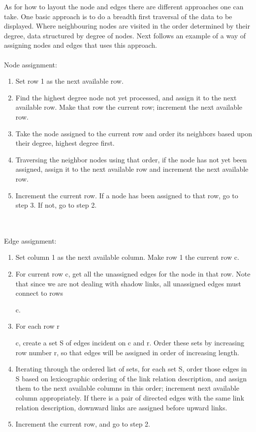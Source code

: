 \documentclass[a4paper,11pt]{kth-mag}
\begin{document}
As for how to layout the node and edges there are different approaches one can take. One basic approach is to do a breadth first traversal of the data to be displayed. Where neighbouring nodes
are visited in the order determined by their degree, data structured by degree of nodes. Next follows an example of a way of assigning nodes and edges that uses this approach\cite{23102059}.
\\
\\
Node assignment:
\begin{enumerate}
	\item Set row 1 as the next available row.
	\item Find the highest degree node not yet processed, and
		  assign it to the next available row. Make that row the
		  current row; increment the next available row.
	\item Take the node assigned to the current row and
		  order its neighbors based upon their degree, highest
		  degree first.
	\item Traversing the neighbor nodes using that order, if the
		  node has not yet been assigned, assign it to the next
		  available row and increment the next available row.
	\item Increment the current row. If a node has been assigned
		  to that row, go to step 3. If not, go to step 2.
\end{enumerate}
\\
\\
Edge assignment:
\begin{enumerate}
	\item Set column 1 as the next available column. Make row
		  1 the current row c.
	\item For current row c, get all the unassigned edges for the
		  node in that row. Note that since we are not dealing
		  with shadow links, all unassigned edges must connect
		  to rows \begin{mathsurround} \math \ge \end{mathsurround} c.
	\item For each row r \begin{mathsurround} \math \ge \end{mathsurround} c, create a set S of edges incident on
		  c and r. Order these sets by increasing row number r,
		  so that edges will be assigned in order of increasing
		  length.
	\item Iterating through the ordered list of sets, for each set
		  S, order those edges in S based on lexicographic
		  ordering of the link relation description, and assign
		  them to the next available columns in this order;
		  increment next available column appropriately. If
		  there is a pair of directed edges with the same link
		  relation description, downward links are assigned
		  before upward links.
	\item Increment the current row, and go to step 2.
\end{enumerate}
\end{document}
